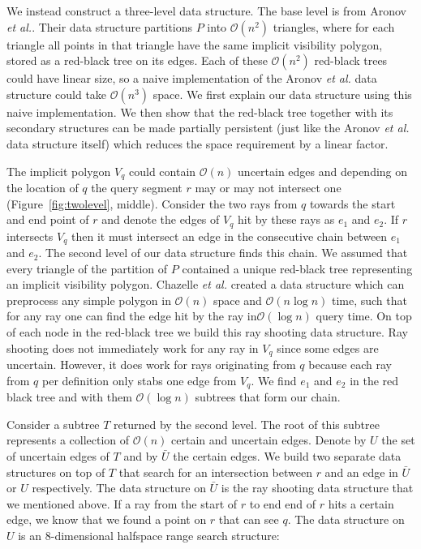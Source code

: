 \documentclass[a4paper, UKenglish]{paper}
\newcommand{\etal}{\textit{et al.}\xspace}
\begin{document}
We instead construct a three-level data structure. The base level is from Aronov \etal. Their data structure partitions $P$ into $\mathcal{O}(n^2)$ triangles, where for each triangle all points in that triangle have the same implicit visibility polygon, stored as a red-black tree on its edges. Each of these $\mathcal{O}(n^2)$ red-black trees could have linear size, so a naive implementation of the Aronov \etal data structure could take $\mathcal{O}(n^3)$ space. We first explain our data structure using this naive implementation. We then show that the red-black tree together with its secondary structures can be made partially persistent (just like the Aronov \etal data structure itself) which reduces the space requirement by a linear factor.

The implicit polygon $V_q$ could contain $\mathcal{O}(n)$ uncertain edges and depending on the location of $q$ the query segment $r$ may or may not intersect one (Figure~\ref{fig:twolevel}, middle). Consider the two rays from $q$ towards the start and end point of $r$ and denote the edges of $V_q$ hit by these rays as $e_1$ and $e_2$. If $r$ intersects $V_q$ then it must intersect an edge in the consecutive chain between $e_1$ and $e_2$. The second level of our data structure finds this chain. We assumed that every triangle of the partition of $P$ contained a unique red-black tree representing an implicit visibility polygon. Chazelle \etal \cite{chazelle1994ray}  created a data structure which can preprocess any simple polygon in $\mathcal{O}(n)$ space and $\mathcal{O}(n \log n)$ time, such that for any ray one can find the edge hit by the ray in$\mathcal{O}(\log n)$ query time. On top of each node in the red-black tree we build this ray shooting data structure. Ray shooting does not immediately work for any ray in $V_q$ since some edges are uncertain. However, it does work for rays originating from $q$ because each ray from $q$ per definition only stabs one edge from $V_q$.  We find $e_1$ and $e_2$ in the red black tree and with them $\mathcal{O}(\log n)$ subtrees that form our chain.

Consider a subtree $T$ returned by the second level. The root of this subtree represents a collection of $\mathcal{O}(n)$ certain and uncertain edges. Denote by $U$ the set of uncertain edges of $T$ and by $\bar{U}$ the certain edges. We build two separate data structures on top of $T$ that search for an intersection between $r$ and an edge in $\bar{U}$ or $U$ respectively. The data structure on $\bar{U}$ is the ray shooting data structure that we mentioned above. If a ray from the start of $r$ to end end of $r$ hits a certain edge, we know that we found a point on $r$ that can see $q$. The data structure on $U$ is an $8$-dimensional halfspace range search structure: 
\end{document}
